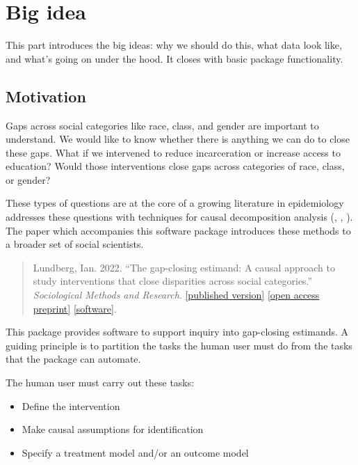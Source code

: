 \documentclass[
]{article}
\providecommand{\tightlist}{%
  \setlength{\itemsep}{0pt}\setlength{\parskip}{0pt}}
\begin{document}
\hypertarget{big-idea}{%
\section{Big idea}\label{big-idea}}

This part introduces the big ideas: why we should do this, what data look like, and what's going on under the hood. It closes with basic package functionality.

\hypertarget{motivation}{%
\subsection{Motivation}\label{motivation}}

Gaps across social categories like race, class, and gender are important to understand. We would like to know whether there is anything we can do to close these gaps. What if we intervened to reduce incarceration or increase access to education? Would those interventions close gaps across categories of race, class, or gender?

These types of questions are at the core of a growing literature in epidemiology addresses these questions with techniques for causal decomposition analysis (\citet{vanderweele2014}, \citet{jackson2018}, \citet{jackson2020}). The paper which accompanies this software package introduces these methods to a broader set of social scientists.

\begin{quote}
Lundberg, Ian. 2022. ``The gap-closing estimand: A causal approach to study interventions that close disparities across social categories.'' \emph{Sociological Methods and Research}. \href{https://doi.org/10.1177/00491241211055769}{{[}published version{]}} \href{https://doi.org/10.31235/osf.io/gx4y3}{{[}open access preprint{]}} \href{https://ilundberg.github.io/gapclosing/}{{[}software{]}}.
\end{quote}

This package provides software to support inquiry into gap-closing estimands. A guiding principle is to partition the tasks the human user must do from the tasks that the package can automate.

The human user must carry out these tasks:

\begin{itemize}
\tightlist
\item
  Define the intervention
\item
  Make causal assumptions for identification
\item
  Specify a treatment model and/or an outcome model
\end{itemize}
\end{document}
